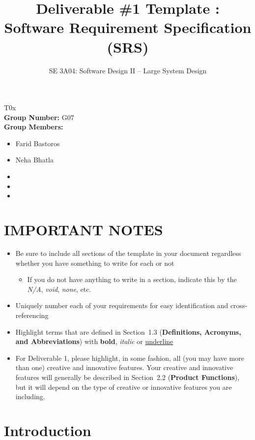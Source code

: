 \documentclass[]{article}
\title{Deliverable \#1 Template : Software Requirement Specification (SRS)}
\author{SE 3A04: Software Design II -- Large System Design}
\date{}
\begin{document}
\setlength\parindent{0pt} 
\setlength{\parskip}{\baselineskip}

\maketitle	
{} T0x\\
{\bf Group Number:} G07 \\
{\bf Group Members:} 
\begin{itemize}
	\item Farid Bastoros 
	\item Neha Bhatla
	\item 
	\item
	\item  
\end{itemize}

\section*{IMPORTANT NOTES}
\begin{itemize}
	\item Be sure to include all sections of the template in your document regardless whether you have something to write for each or not
	\begin{itemize}
		\item If you do not have anything to write in a section, indicate this by the \emph{N/A}, \emph{void}, \emph{none}, etc.
	\end{itemize}
	\item Uniquely number each of your requirements for easy identification and cross-referencing
	\item Highlight terms that are defined in Section~1.3 (\textbf{Definitions, Acronyms, and Abbreviations}) with \textbf{bold}, \emph{italic} or \underline{underline}
	\item For Deliverable 1, please highlight, in some fashion, all (you may have more than one) creative and innovative features. Your creative and innovative features will generally be described in Section~2.2 (\textbf{Product Functions}), but it will depend on the type of creative or innovative features you are including.
\end{itemize}

\newpage
\section{Introduction}
\label{sec:introduction}
\end{document}
